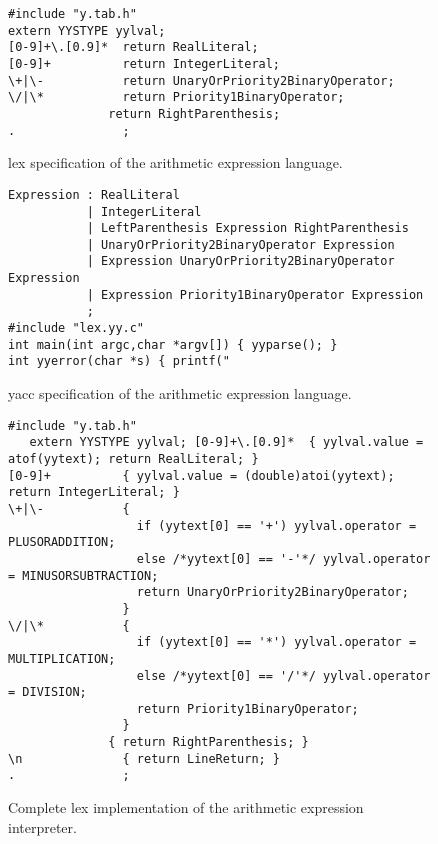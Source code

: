 \documentclass[preprint]{elsarticle}
\begin{document}
\begin{figure*}[tb!]
\begin{verbatim}
#include "y.tab.h"
extern YYSTYPE yylval;
[0-9]+\.[0.9]*  return RealLiteral;
[0-9]+          return IntegerLiteral;
\+|\-           return UnaryOrPriority2BinaryOperator;
\/|\*           return Priority1BinaryOperator;
              return RightParenthesis;
.               ;
\end{verbatim}
\caption{lex specification of the arithmetic expression language.} \label{fig:calclex}
\end{figure*}
\begin{figure*}[tb!]
\begin{verbatim}
Expression : RealLiteral
           | IntegerLiteral
           | LeftParenthesis Expression RightParenthesis
           | UnaryOrPriority2BinaryOperator Expression
           | Expression UnaryOrPriority2BinaryOperator Expression
           | Expression Priority1BinaryOperator Expression
           ;
#include "lex.yy.c"
int main(int argc,char *argv[]) { yyparse(); }
int yyerror(char *s) { printf("\end{verbatim}
\caption{yacc specification of the arithmetic expression language.} \label{fig:calcyacc}
\end{figure*}

\begin{figure*}[tb!]
\begin{verbatim}
#include "y.tab.h"
   extern YYSTYPE yylval; [0-9]+\.[0.9]*  { yylval.value = atof(yytext); return RealLiteral; }
[0-9]+          { yylval.value = (double)atoi(yytext); return IntegerLiteral; }
\+|\-           {
                  if (yytext[0] == '+') yylval.operator = PLUSORADDITION;
                  else /*yytext[0] == '-'*/ yylval.operator = MINUSORSUBTRACTION;
                  return UnaryOrPriority2BinaryOperator;
                }
\/|\*           {
                  if (yytext[0] == '*') yylval.operator = MULTIPLICATION;
                  else /*yytext[0] == '/'*/ yylval.operator = DIVISION;
                  return Priority1BinaryOperator;
                }
              { return RightParenthesis; }
\n              { return LineReturn; }
.               ;
\end{verbatim}
\caption{Complete lex implementation of the arithmetic expression interpreter.} \label{fig:calcimlex}
\end{figure*}
\end{document}
